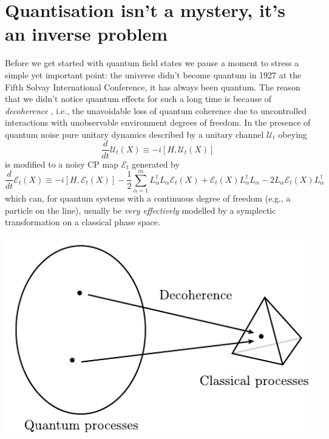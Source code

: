 \documentclass[11pt]{amsart}
\theoremstyle{plain}%
\theoremstyle{definition}
\theoremstyle{remark}
\begin{document}
\section{Quantisation isn't a mystery, it's an inverse problem}\label{sec:quant}
Before we get started with quantum field states we pause a moment to stress a simple yet important point: the universe didn't become quantum in 1927 at the Fifth Solvay International Conference, it has always been quantum. The reason that we didn't notice quantum effects for such a long time is because of \emph{decoherence} \cite{joos_decoherence_2003,gardiner_quantum_2010}, i.e., the unavoidable loss of quantum coherence due to uncontrolled interactions with unobservable environment degrees of freedom. In the presence of quantum noise pure unitary dynamics described by a unitary channel $\mathcal{U}_t$ obeying 
\begin{equation}
	\frac{d}{dt}\mathcal{U}_t(X) \equiv -i [H, \mathcal{U}_t(X)]
\end{equation}
is modified \cite{davies_quantum_1976} to a noisy CP map $\mathcal{E}_t$ generated by 
\begin{equation}
	\frac{d}{dt}\mathcal{E}_t(X) \equiv -i [H, \mathcal{E}_t(X)] -\frac12\sum_{\alpha=1}^m L_\alpha^\dag L_\alpha \mathcal{E}_t(X) + \mathcal{E}_t(X) L_\alpha^\dag L_\alpha - 2 L_\alpha \mathcal{E}_t(X) L_\alpha^\dag
\end{equation}
which can, for quantum systems with a continuous degree of freedom (e.g., a particle on the line), usually be \emph{very effectively} modelled by a symplectic transformation on a classical phase space. 
\begin{center}
\includegraphics{Decoherence.pdf}
\end{center}
\end{document}
